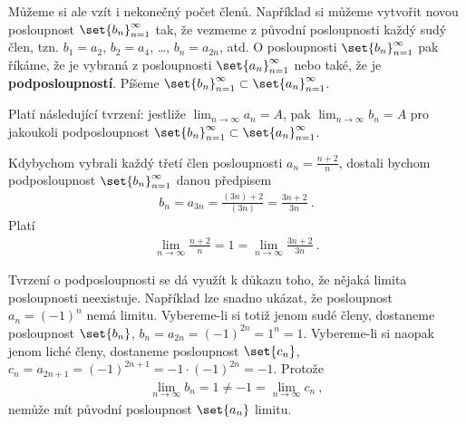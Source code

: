 Můžeme si ale vzít i nekonečný počet členů. Například si můžeme vytvořit novou posloupnost $\set{b_n}_{n=1}^\infty$ tak, že vezmeme z původní posloupnosti každý sudý člen, tzn. $b_1 = a_2$, $b_2 = a_4$, \dots, $b_n = a_{2n}$, atd. O posloupnosti $\set{b_n}_{n=1}^\infty$ pak říkáme, že je vybraná z posloupnosti $\set{a_n}_{n=1}^\infty$ nebo také, že je \textbf{podposloupností}. Píšeme $\set{b_n}_{n=1}^\infty \subset \set{a_n}_{n=1}^\infty$.

Platí následující tvrzení: jestliže $\lim_{n \rightarrow \infty} a_n = A$, pak $\lim_{n \rightarrow \infty} b_n = A$ pro jakoukoli podposloupnost $\set{b_n}_{n=1}^\infty \subset \set{a_n}_{n=1}^\infty$.

\begin{example}
    Kdybychom vybrali každý třetí člen posloupnosti $a_n = \frac{n+2}{n}$, dostali bychom podposloupnost $\set{b_n}_{n=1}^\infty$ danou předpisem
    \begin{align}
        b_n = a_{3n} = \frac{(3n)+2}{(3n)} = \frac{3n+2}{3n} \:.
    \end{align}
    Platí
    \begin{align}
        \lim_{n \rightarrow \infty} \frac{n+2}{n} = 1 = \lim_{n \rightarrow \infty} \frac{3n+2}{3n} \:.
    \end{align}
\end{example}

\begin{example}
    Tvrzení o podposloupnosti se dá využít k důkazu toho, že nějaká limita posloupnosti neexistuje. Například lze snadno ukázat, že posloupnost $a_n = (-1)^n$ nemá limitu.
    Vybereme-li si totiž jenom sudé členy, dostaneme posloupnost $\set{b_n}$, $b_n = a_{2n} = (-1)^{2n} = 1^n = 1$. Vybereme-li si naopak jenom liché členy, dostaneme posloupnost $\set{c_n}$, $c_n = a_{2n+1} = (-1)^{2n+1} = -1 \cdot (-1)^{2n} = -1 $.
    Protože 
    \begin{align}
        \lim_{n \rightarrow \infty} b_n = 1 \neq -1 = \lim_{n \rightarrow \infty} c_n \:,
    \end{align}
    nemůže mít původní posloupnost $\set{a_n}$ limitu.
\end{example}
